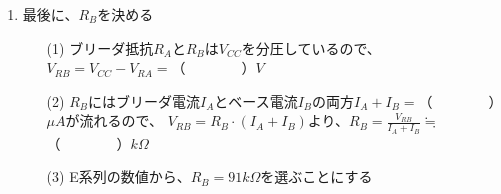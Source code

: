\documentclass[uplatex,a4paper,11pt,oneside,openany]{jsbook}
\begin{document}
\begin{enumerate}
\begin{itembox}[l]{設計条件}
  (6) このトランジスタのベース−エミッタ間の電圧は$V_{BE}\fallingdotseq 0.6V$とする。\\
  (7) $R_A$にはベース電流$I_B$の20倍の電流（ブリーダ電流$I_A$）を流すことにする。
  \end{itembox}
  \begin{enumerate}
  \item[(1)] コレクタ電流$I_C$に$1mA$を流す時のベース電流$I_B$は、
  $I_B=\displaystyle\frac{I_C}{h_{FE}}=$（　　　　）$\mu A$
  \item[(2)] 設計条件（7）よりブリーダ電流は、$I_A=20\times I_B=$（　　　　）$\mu A$
  \item[(3)] ベース電位は$V_B=V_{BE}+V_{RE}$であるから、$V_B=（　　　）＋（　　　）$=（　　　）$V$
  \item[(4)] この値$V_B$は、$R_A$にブリーダ電流$I_A$が流れることによる電圧降下$V_{RA}$に等しいから、\\
  $R_A=\displaystyle\frac{V_{RA}}{I_A}=\frac{V_B}{I_A}=$（　　　）$k\Omega$
  \end{enumerate}
  \vfill
  \item 最後に、$R_B$を決める
  \begin{enumerate}
  \item[(1)] ブリーダ抵抗$R_A$と$R_B$は$V_{CC}$を分圧しているので、
  $V_{RB}=V_{CC}-V_{RA}=$（　　　　）$V$
  \item[(2)] $R_B$にはブリーダ電流$I_A$とベース電流$I_B$の両方$I_A+I_B=$（　　　　）$\mu A$が流れるので、
  $V_{RB}=R_B\cdot(I_A+I_B)$より、$R_B=\displaystyle\frac{V_{RB}}{I_A+I_B}\fallingdotseq$（　　　　）$k\Omega$
  \item[(3)] E系列の数値から、$R_B=91k\Omega$を選ぶことにする
  \end{enumerate}
\end{enumerate}

\end{document}
